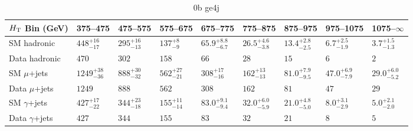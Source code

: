\documentclass[8pt]{article}
\def\scalht{\mbox{$H_{\rm{T}}$}\xspace}
\newcommand\T{\rule{0pt}{2.6ex}}
\newcommand\B{\rule[-1.2ex]{0pt}{0pt}}
\begin{document}
\begin{table}[ht!]
\caption{0b ge4j}
\label{tab:ensemble-0b ge4j}
\centering
\begin{tabular}{ lllllllll }

\hline
\scalht Bin (GeV)       & 375--475                       & 475--575                       & 575--675                       & 675--775                       & 775--875                       & 875--975                       & 975--1075                      & 1075--$\infty$                 \\ [1.000000ex]
\hline
SM hadronic\T           & $448^{+16}_{-17}$              & $295^{+16}_{-13}$              & $137^{+8}_{-9}$                & $65.9^{+8.8}_{-6.7}$           & $26.5^{+4.6}_{-3.8}$           & $13.4^{+2.8}_{-2.5}$           & $6.7^{+2.5}_{-1.9}$            & $3.7^{+1.5}_{-1.3}$            \\ 
Data hadronic\B         & $470$                          & $302$                          & $158$                          & $66$                           & $28$                           & $15$                           & $6$                            & $2$                            \\ 
\hline
SM $\mu$+jets\T         & $1249^{+38}_{-36}$             & $888^{+30}_{-32}$              & $562^{+27}_{-21}$              & $308^{+17}_{-16}$              & $162^{+13}_{-13}$              & $81.0^{+7.9}_{-9.5}$           & $47.0^{+6.9}_{-7.9}$           & $29.0^{+6.0}_{-5.2}$           \\ 
Data $\mu$+jets\B       & $1249$                         & $888$                          & $562$                          & $308$                          & $162$                          & $81$                           & $47$                           & $29$                           \\ 
\hline
SM $\gamma$+jets\T      & $427^{+17}_{-22}$              & $344^{+23}_{-18}$              & $155^{+11}_{-14}$              & $83.0^{+9.1}_{-9.4}$           & $32.0^{+6.0}_{-5.9}$           & $21.0^{+4.8}_{-5.0}$           & $8.0^{+3.1}_{-2.9}$            & $5.0^{+2.1}_{-2.0}$            \\ 
Data $\gamma$+jets\B    & $427$                          & $344$                          & $155$                          & $83$                           & $32$                           & $21$                           & $8$                            & $5$                            \\ 
\hline

\end{tabular}
\end{table}
\end{document}
